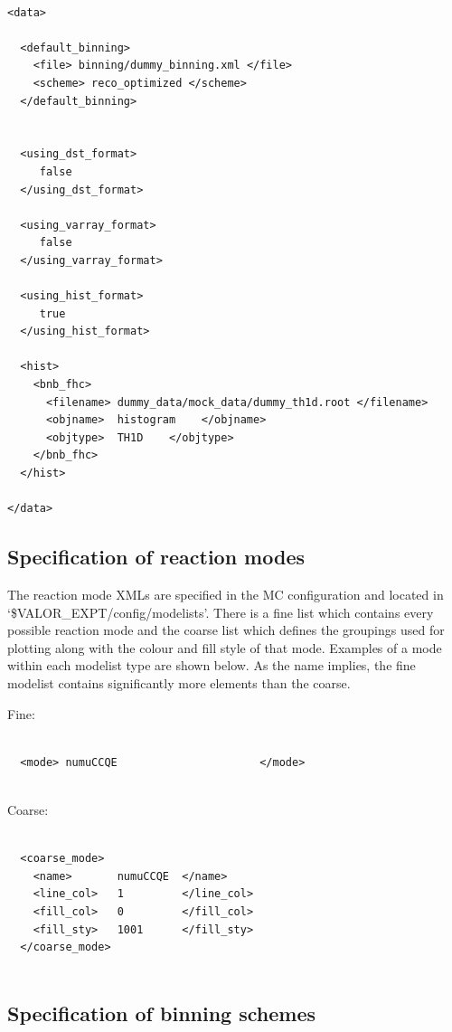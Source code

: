 {\color{capri}
\begin{verbatim}

<data>

  <default_binning> 
    <file> binning/dummy_binning.xml </file>
    <scheme> reco_optimized </scheme>
  </default_binning>
  
  
  <using_dst_format> 
     false
  </using_dst_format> 

  <using_varray_format> 
     false 
  </using_varray_format> 

  <using_hist_format> 
     true 
  </using_hist_format> 

  <hist> 
    <bnb_fhc>
      <filename> dummy_data/mock_data/dummy_th1d.root </filename> 
      <objname>  histogram    </objname> 
      <objtype>  TH1D    </objtype> 
    </bnb_fhc>
  </hist>
  
</data>

\end{verbatim}
}

\subsection{Specification of reaction modes}

The reaction mode XMLs are specified in the MC configuration and located in `\$VALOR\_EXPT/config/modelists'. There is a fine list which contains every possible reaction mode and the coarse list which defines the groupings used for plotting along with the colour and fill style of that mode. Examples of a mode within each modelist type are shown below. As the name implies, the fine modelist contains significantly more elements than the coarse.

Fine:
{\color{capri}
\begin{verbatim}

  <mode> numuCCQE                      </mode>
    
\end{verbatim}
}

Coarse:
{\color{capri}
\begin{verbatim}

  <coarse_mode>
    <name>       numuCCQE  </name>
    <line_col>   1         </line_col>
    <fill_col>   0         </fill_col>
    <fill_sty>   1001      </fill_sty>
  </coarse_mode>
    
\end{verbatim}
}

\subsection{Specification of binning schemes}

